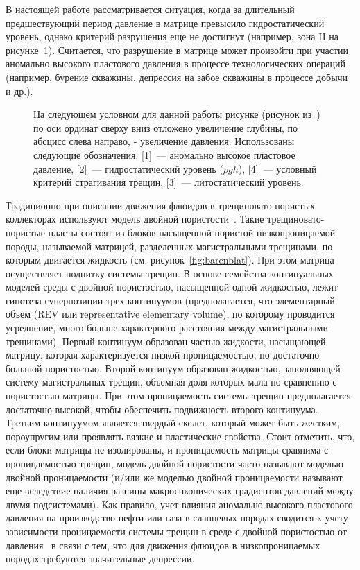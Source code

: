 В настоящей работе рассматривается ситуация, когда за длительный предшествующий период давление в матрице превысило гидростатический уровень, однако критерий разрушения еще не достигнут (например, зона II на рисунке~\ref{fig:NHF}). Считается, что разрушение в матрице может произойти при участии аномально высокого пластового давления в процессе технологических операций (например, бурение скважины, депрессия на забое скважины в процессе добычи и др.).

\begin{figure}[ht]
  \caption{На следующем условном для данной работы рисунке (рисунок из~\autocite{luo2002natural}) по оси ординат сверху вниз отложено увеличение глубины, по абсцисс слева направо, - увеличение давления. Использованы следующие обозначения: [1]~--- аномально высокое пластовое давление, [2]~--- гидростатический уровень ($\rho g h$), [4]~--- условный критерий страгивания трещин, [3]~--- литостатический уровень.}
  \label{fig:NHF}
\end{figure}

Традиционно при описании движения флюидов в трещиновато-пористых коллекторах используют модель двойной пористости~\autocite{barenblatt1960basic, golf1986, wu2014generalized}. Такие трещиновато-пористые пласты состоят из блоков насыщенной пористой низкопроницаемой породы, называемой матрицей, разделенных магистральными трещинами, по которым двигается жидкость (см. рисунок~\ref{fig:barenblat}). При этом матрица осуществляет подпитку системы трещин. В основе семейства континуальных моделей среды с двойной пористостью, насыщенной одной жидкостью, лежит гипотеза суперпозиции трех континуумов (предполагается, что элементарный объем (REV или representative elementary volume), по которому проводится усреднение, много больше характерного расстояния между магистральными трещинами). Первый континуум образован частью жидкости, насыщающей матрицу, которая характеризуется низкой проницаемостью, но достаточно большой пористостью. Второй континуум образован жидкостью, заполняющей систему магистральных трещин, объемная доля которых мала по сравнению с пористостью матрицы. При этом проницаемость системы трещин предполагается достаточно высокой, чтобы обеспечить подвижность второго континуума. Третьим континуумом является твердый скелет, который может быть жестким, пороупругим или проявлять вязкие и пластические свойства. Стоит отметить, что, если блоки матрицы не изолированы, и проницаемость матрицы сравнима с проницаемостью трещин, модель двойной пористости часто называют моделью двойной проницаемости (и/или же моделью двойной проницаемости называют еще вследствие наличия разницы макроспкопических градиентов давлений между двумя подсистемами). Как правило, учет влияния аномально высокого пластового давления на производство нефти или газа в сланцевых породах сводится к учету зависимости проницаемости системы трещин в среде с двойной пористостью от давления~\autocite{thompson2010modeling} в связи с тем, что для движения флюидов в низкопроницаемых породах требуются значительные депрессии.


